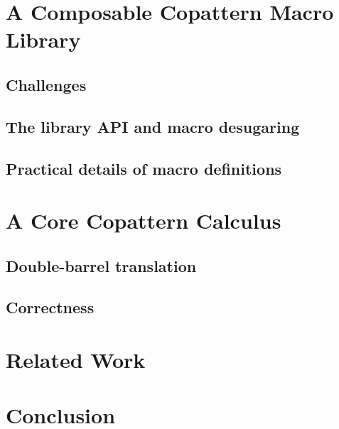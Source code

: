 \documentclass[runningheads]{llncs}
\begin{document}
\section{A Composable Copattern Macro Library}
\label{sec-api}

\subsection{Challenges}
\label{sec-challenges}


\subsection{The library API and macro desugaring}
\label{sec-desugaring}


\subsection{Practical details of macro definitions}
\label{sec-macro}


\section{A Core Copattern Calculus}
\label{sec-translation}

\subsection{Double-barrel translation}


\subsection{Correctness}
\label{sec-correctness}



% 

\section{Related Work} \label{sec-related-work}



\section{Conclusion} \label{sec-conclusion}
\end{document}
